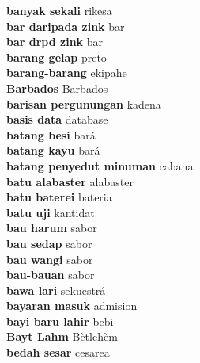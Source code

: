 \textbf{ banyak sekali  } rikesa \\
\textbf{ bar daripada zink  } bar \\
\textbf{ bar drpd zink  } bar \\
\textbf{ barang gelap  } preto \\
\textbf{ barang-barang  } ekipahe \\
\textbf{ Barbados  } Barbados \\
\textbf{ barisan pergunungan  } kadena \\
\textbf{ basis data  } database \\
\textbf{ batang besi  } bará \\
\textbf{ batang kayu  } bará \\
\textbf{ batang penyedut minuman  } cabana \\
\textbf{ batu alabaster  } alabaster \\
\textbf{ batu baterei  } bateria \\
\textbf{ batu uji  } kantidat \\
\textbf{ bau harum  } sabor \\
\textbf{ bau sedap  } sabor \\
\textbf{ bau wangi  } sabor \\
\textbf{ bau-bauan  } sabor \\
\textbf{ bawa lari  } sekuestrá \\
\textbf{ bayaran masuk  } admision \\
\textbf{ bayi baru lahir  } bebi \\
\textbf{ Bayt Lahm  } Bètlehèm \\
\textbf{ bedah sesar  } cesarea \\
